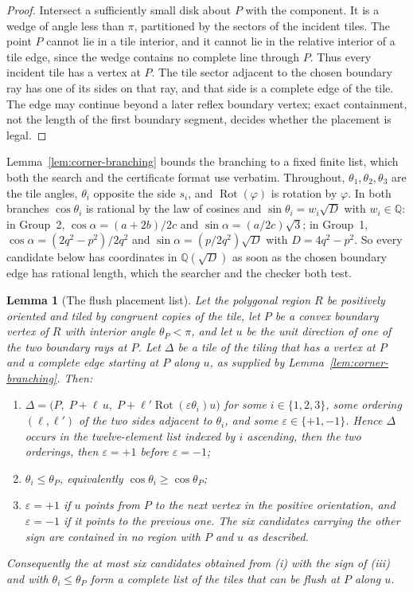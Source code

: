 \documentclass[11pt]{amsart}
\newtheorem{lemma}[theorem]{Lemma}
\theoremstyle{definition}
\theoremstyle{remark}
\newcommand{\Q}{\mathbb Q}
\begin{document}
\begin{proof}
Intersect a sufficiently small disk about $P$ with the component.  It is a
wedge of angle less than $\pi$, partitioned by the sectors of the incident
tiles.  The point $P$ cannot lie in a tile interior, and it cannot lie in the
relative interior of a tile edge, since the wedge contains no complete line
through $P$.  Thus every incident tile has a vertex at $P$.  The tile sector
adjacent to the chosen boundary ray has one of its sides on that ray, and that
side is a complete edge of the tile.  The edge may continue beyond a later
reflex boundary vertex; exact containment, not the length of the first
boundary segment, decides whether the placement is legal.
\end{proof}

Lemma~\ref{lem:corner-branching} bounds the branching to a fixed finite
list, which both the search and the certificate format use verbatim.
Throughout, $\theta_1,\theta_2,\theta_3$ are the tile angles, $\theta_i$
opposite the side $s_i$, and $\operatorname{Rot}(\varphi)$ is rotation by
$\varphi$.  In both branches $\cos\theta_i$ is rational by the law of cosines
and $\sin\theta_i=w_i\sqrt D$ with $w_i\in\Q$: in Group~2,
$\cos\alpha=(a+2b)/2c$ and $\sin\alpha=(a/2c)\sqrt3$; in Group~1,
$\cos\alpha=(2q^2-p^2)/2q^2$ and $\sin\alpha=(p/2q^2)\sqrt D$ with
$D=4q^2-p^2$.  So every candidate below has coordinates in $\Q(\sqrt D)$ as
soon as the chosen boundary edge has rational length, which the searcher and
the checker both test.

\begin{lemma}[The flush placement list]\label{lem:flush-list}
Let the polygonal region $R$ be positively oriented and tiled by congruent
copies of the tile, let $P$ be a convex boundary vertex of $R$ with interior
angle $\theta_P<\pi$, and let $u$ be the unit direction of one of the two
boundary rays at $P$.  Let $\Delta$ be a tile of the tiling that has a vertex
at $P$ and a complete edge starting at $P$ along $u$, as supplied by
Lemma~\ref{lem:corner-branching}.  Then:
\begin{enumerate}[label=\textup{(\roman*)}]
\item $\Delta=\big(P,\;P+\ell\,u,\;
      P+\ell'\operatorname{Rot}(\varepsilon\theta_i)u\big)$
      for some $i\in\{1,2,3\}$, some ordering $(\ell,\ell')$ of the two sides
      adjacent to $\theta_i$, and some $\varepsilon\in\{+1,-1\}$.  Hence
      $\Delta$ occurs in the twelve-element list indexed by $i$ ascending,
      then the two orderings, then $\varepsilon=+1$ before $\varepsilon=-1$;
\item $\theta_i\le\theta_P$, equivalently $\cos\theta_i\ge\cos\theta_P$;
\item $\varepsilon=+1$ if $u$ points from $P$ to the next vertex in the
      positive orientation, and $\varepsilon=-1$ if it points to the previous
      one.  The six candidates carrying the other sign are contained in no
      region with $P$ and $u$ as described.
\end{enumerate}
Consequently the at most six candidates obtained from \textup{(i)} with the
sign of \textup{(iii)} and with $\theta_i\le\theta_P$ form a complete list of
the tiles that can be flush at $P$ along $u$.
\end{lemma}
\end{document}
